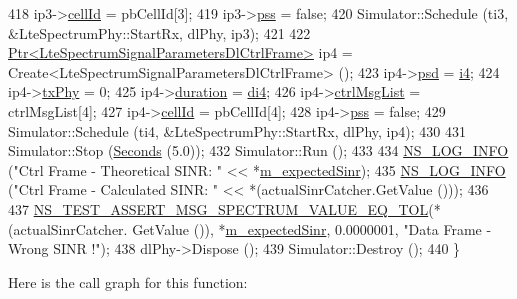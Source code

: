 \begin{DoxyCode}
418   ip3->\hyperlink{structns3_1_1LteSpectrumSignalParametersDlCtrlFrame_aa8b05ebed8e2cfa15d5997f630cc22fb}{cellId} = pbCellId[3];
419   ip3->\hyperlink{structns3_1_1LteSpectrumSignalParametersDlCtrlFrame_a84ab593365d0b4df6450e14aa239cbb0}{pss} = \textcolor{keyword}{false};
420   Simulator::Schedule (ti3, &LteSpectrumPhy::StartRx, dlPhy, ip3);
421   
422   \hyperlink{classns3_1_1Ptr}{Ptr<LteSpectrumSignalParametersDlCtrlFrame>} ip4 = 
      Create<LteSpectrumSignalParametersDlCtrlFrame> ();
423   ip4->\hyperlink{structns3_1_1SpectrumSignalParameters_afc3b87e914306b069232fda861836051}{psd} = \hyperlink{generate__test__data__lte__sinr_8m_a608e2266a7f74d5814905a52df1fc084}{i4};
424   ip4->\hyperlink{structns3_1_1SpectrumSignalParameters_ab20434042353cbd479e1f9d807f9e37d}{txPhy} = 0;
425   ip4->\hyperlink{structns3_1_1SpectrumSignalParameters_aa97149751dce62c95f523622fd5fbfd3}{duration} = \hyperlink{generate__test__data__lte__sinr_8m_a3786cf5a792e021b7a990bce26931073}{di4};
426   ip4->\hyperlink{structns3_1_1LteSpectrumSignalParametersDlCtrlFrame_a1613baa9c2d4adb03399cdffce07bea6}{ctrlMsgList} = ctrlMsgList[4];
427   ip4->\hyperlink{structns3_1_1LteSpectrumSignalParametersDlCtrlFrame_aa8b05ebed8e2cfa15d5997f630cc22fb}{cellId} = pbCellId[4];
428   ip4->\hyperlink{structns3_1_1LteSpectrumSignalParametersDlCtrlFrame_a84ab593365d0b4df6450e14aa239cbb0}{pss} = \textcolor{keyword}{false};
429   Simulator::Schedule (ti4, &LteSpectrumPhy::StartRx, dlPhy, ip4);
430   
431   Simulator::Stop (\hyperlink{group__timecivil_ga33c34b816f8ff6628e33d5c8e9713b9e}{Seconds} (5.0));
432   Simulator::Run ();
433   
434   \hyperlink{group__logging_gafbd73ee2cf9f26b319f49086d8e860fb}{NS\_LOG\_INFO} (\textcolor{stringliteral}{"Ctrl Frame - Theoretical SINR: "} << *\hyperlink{classLteDownlinkCtrlSinrTestCase_a0ae82f18c62d462c2f5a88a9ac9aa0e4}{m\_expectedSinr});
435   \hyperlink{group__logging_gafbd73ee2cf9f26b319f49086d8e860fb}{NS\_LOG\_INFO} (\textcolor{stringliteral}{"Ctrl Frame - Calculated SINR: "} << *(actualSinrCatcher.GetValue ()));
436   
437   \hyperlink{spectrum-test_8h_ac37d86c7027e04c671885b0f087ab7e0}{NS\_TEST\_ASSERT\_MSG\_SPECTRUM\_VALUE\_EQ\_TOL}(*(actualSinrCatcher.
      GetValue ()), *\hyperlink{classLteDownlinkCtrlSinrTestCase_a0ae82f18c62d462c2f5a88a9ac9aa0e4}{m\_expectedSinr}, 0.0000001, \textcolor{stringliteral}{"Data Frame - Wrong SINR !"});
438   dlPhy->Dispose ();
439   Simulator::Destroy ();
440 \}
\end{DoxyCode}


Here is the call graph for this function\+:




